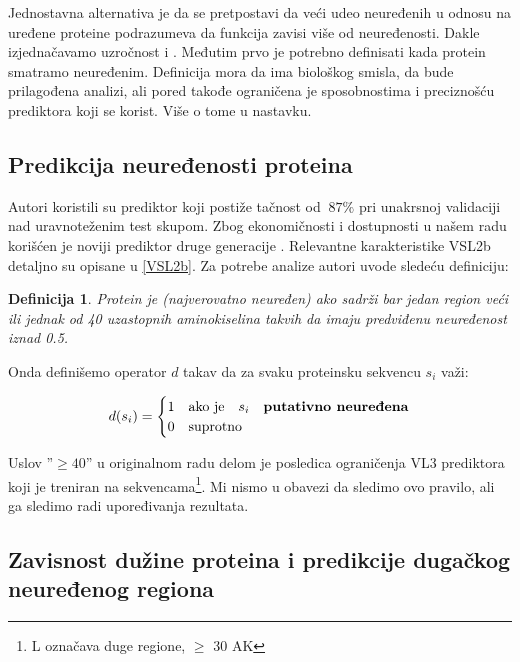 Jednostavna alternativa je da se pretpostavi da veći udeo neuređenih u odnosu na
uređene proteine podrazumeva da funkcija zavisi više od neuređenosti.  Dakle
izjednačavamo uzročnost  i . Međutim prvo je
potrebno definisati kada protein smatramo neuređenim.  Definicija mora da
ima biološkog smisla, da bude prilagođena analizi, ali pored takođe ograničena je
sposobnostima i preciznošću prediktora koji se korist.  Više o tome u nastavku.

\subsection{Predikcija neuređenosti proteina}

Autori \parencite{Xie2007} koristili su  prediktor koji
postiže tačnost od $~87\%$ pri unakrsnoj validaciji nad uravnoteženim test
skupom.  Zbog ekonomičnosti i dostupnosti u našem radu korišćen je noviji
prediktor druge generacije .
Relevantne karakteristike VSL2b detaljno su opisane u \ref{VSL2b}.
Za potrebe analize autori \parencite{Xie2007} uvode sledeću definiciju:

\newtheorem{mydef}{Definicija}
\begin{mydef}
\label{pdis_def}
Protein je (najverovatno neuređen) 
ako sadrži bar jedan region veći ili jednak od 40 uzastopnih aminokiselina
takvih da imaju \textit{predviđenu neuređenost} iznad 0.5. 
\end{mydef}

Onda definišemo operator $d$ takav da za svaku proteinsku sekvencu $s_i$ važi:

\[   
  d(s_i) = 
    \begin{cases}
      1 & \text{ako je} \quad s_i \quad \textbf{putativno neuređena}\\
      0 & \text{suprotno}
    \end{cases}
\]

Uslov ''$\ge40$'' u originalnom radu delom je posledica ograničenja VL3
prediktora koji je treniran na  sekvencama\footnote{L označava
duge regione, $\ge$ 30 AK}. Mi nismo u obavezi da sledimo ovo pravilo, ali ga sledimo
radi upoređivanja rezultata.

\subsection{Zavisnost dužine proteina i predikcije dugačkog neuređenog regiona}

